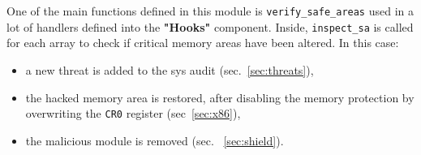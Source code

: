 \documentclass{article}
\begin{document}
	
	
	One of the main functions defined in this module is \texttt{verify\_safe\_areas} used in a lot of handlers defined into the 
	\textbf{"Hooks"} component. Inside, \texttt{inspect\_sa} is called for each array to check if critical memory areas have been 
	altered. In this case:
	
	\begin{itemize}
		\item a new threat is added to the sys audit (sec.~\ref{sec:threats}),
		\item the hacked memory area is restored, after disabling the memory protection by overwriting the \texttt{CR0} register 
		(sec~\ref{sec:x86}),
		\item the malicious module is removed (sec. ~\ref{sec:shield}).
	\end{itemize}

	
	
\end{document}
